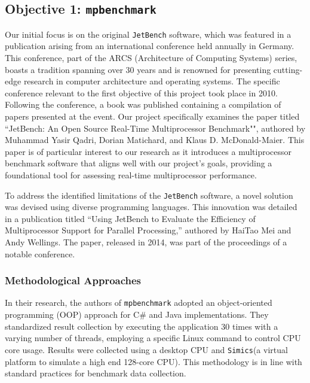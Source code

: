 \subsection{Objective 1: \texttt{mpbenchmark}}
Our initial focus is on the original \texttt{JetBench} software, which was featured in a publication arising from an international conference held annually in Germany. This conference, part of the ARCS (Architecture of Computing Systems) series, boasts a tradition spanning over 30 years and is renowned for presenting cutting-edge research in computer architecture and operating systems. The specific conference relevant to the first objective of this project took place in 2010. Following the conference, a book was published containing a compilation of papers presented at the event. Our project specifically examines the paper titled ``JetBench: An Open Source Real-Time Multiprocessor Benchmark"", authored by Muhammad Yasir Qadri, Dorian Matichard, and Klaus D. McDonald-Maier. This paper is of particular interest to our research as it introduces a multiprocessor benchmark software that aligns well with our project's goals, providing a foundational tool for assessing real-time multiprocessor performance\cite{JetBench_paper}.

To address the identified limitations of the \texttt{JetBench} software, a novel solution was devised using diverse programming languages. This innovation was detailed in a publication titled ``Using JetBench to Evaluate the Efficiency of Multiprocessor Support for Parallel Processing,'' authored by HaiTao Mei and Andy Wellings. The paper, released in 2014, was part of the proceedings of a notable conference\cite{mpbenchmark_paper}.

\subsubsection{Methodological Approaches}

In their research, the authors of \texttt{mpbenchmark}\cite{mpbenchmark_paper} adopted an object-oriented programming (OOP) approach for C\# and Java implementations. They standardized result collection by executing the application 30 times with a varying number of threads, employing a specific Linux command to control CPU core usage. Results were collected using a desktop CPU and \texttt{Simics}(a virtual platform to simulate a high end 128-core CPU).  This methodology is in line with standard practices for benchmark data collection.

